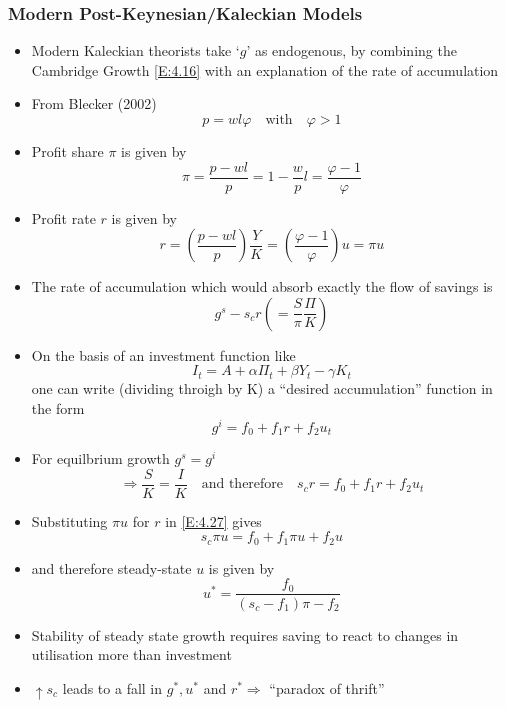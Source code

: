 \documentclass{article}
\begin{document}
\subsubsection{Modern Post-Keynesian/Kaleckian Models}
	\begin{itemize}
		\item Modern Kaleckian theorists take `\( g \)' as endogenous, by combining the Cambridge Growth \cref{E:4.16} with an explanation of the rate of accumulation
		\item From Blecker (2002)
		\begin{equation}
			p = wl\varphi \quad\text{with}\quad \varphi>1 \label{E:4.21}
		\end{equation}
		\item Profit share \( \pi \) is given by
		\begin{equation}
			\pi = \frac{p-wl}{p} = 1-\frac{w}{p}l = \frac{\varphi-1}{\varphi} \label{E:4.22}
		\end{equation}
		\item Profit rate \( r \) is given by
		\begin{equation}
			r=\left(\frac{p-wl}{p}\right)\frac{Y}{K} = \left( \frac{\varphi-1}{\varphi} \right) u = \pi u \label{E:4.23}
		\end{equation}
		\item The rate of accumulation which would absorb exactly the flow of savings is
		\begin{equation}
			g^s - s_c r \left( =\frac{S}{\pi}\frac{\Pi}{K} \right) \label{E:4.24}
		\end{equation}
		\item On the basis of an investment function like
		\begin{equation}
			I_t = A + \alpha\Pi_t + \beta Y_t - \gamma K_t \label{E:4.25}
		\end{equation}
		one can write (dividing throigh by K) a ``desired accumulation'' function in the form
		\begin{equation}
			g^i = f_0 + f_1r + f_2u_t \label{E:4.26}
		\end{equation}
		\item For equilbrium growth \( g^s = g^i \)
		\begin{equation}
			\Rightarrow \frac{S}{K}=\frac{I}{K} \quad\text{and therefore}\quad s_c r = f_0+f_1r+f_2 u_t \label{E:4.27}
		\end{equation}
		\item Substituting \( \pi u \) for \( r \) in \cref{E:4.27} gives
		\begin{equation}
			s_c\pi u = f_0 + f_1 \pi u + f_2 u \label{E:4.28}
		\end{equation}
		\item and therefore steady-state \( u \) is given by
		\begin{equation}
			u^*=\frac{f_0}{(s_c - f_1)\pi - f_2} \label{E:4.29}
		\end{equation}
		\item Stability of steady state growth requires saving to react to changes in utilisation more than investment
		\item \( \uparrow s_c \) leads to a fall in \( g^*, u^* \) and \( r^* \Rightarrow \) ``paradox of thrift''
	\end{itemize}
\end{document}

